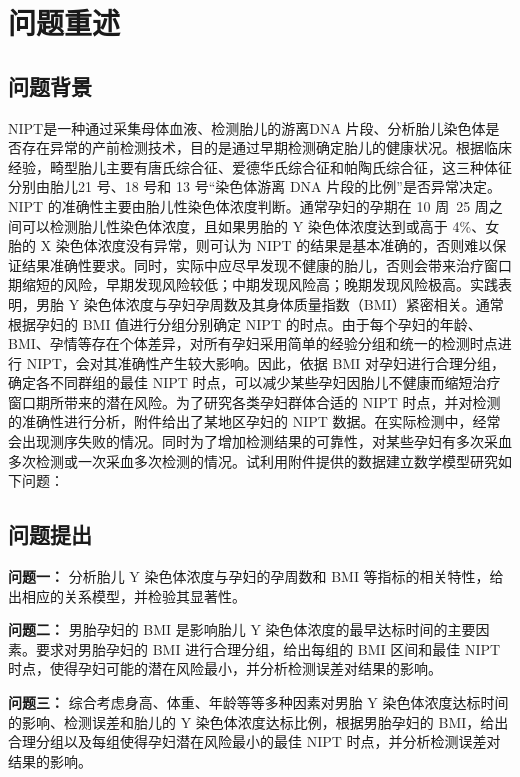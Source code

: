 \documentclass[withoutpreface,bwprint]{cumcmthesis} %
\begin{document}
\section{问题重述}
\subsection{问题背景}
NIPT是一种通过采集母体血液、检测胎儿的游离DNA 片段、分析胎儿染色体是否存在异常的产前检测技术，目的是通过早期检测确定胎儿的健康状况。根据临床经验，畸型胎儿主要有唐氏综合征、爱德华氏综合征和帕陶氏综合征，这三种体征分别由胎儿21 号、18 号和 13 号“染色体游离 DNA 片段的比例”是否异常决定。NIPT 的准确性主要由胎儿性染色体浓度判断。通常孕妇的孕期在 10 周~25 周之间可以检测胎儿性染色体浓度，且如果男胎的 Y 染色体浓度达到或高于 4\%、女胎的 X 染色体浓度没有异常，则可认为 NIPT 的结果是基本准确的，否则难以保证结果准确性要求。同时，实际中应尽早发现不健康的胎儿，否则会带来治疗窗口期缩短的风险，早期发现风险较低；中期发现风险高；晚期发现风险极高。实践表明，男胎 Y 染色体浓度与孕妇孕周数及其身体质量指数（BMI）紧密相关。通常根据孕妇的
BMI 值进行分组分别确定 NIPT 的时点。由于每个孕妇的年龄、BMI、孕情等存在个体差异，对所有孕妇采用简单的经验分组和统一的检测时点进行 NIPT，会对其准确性产生较大影响。因此，依据 BMI 对孕妇进行合理分组，确定各不同群组的最佳 NIPT 时点，可以减少某些孕妇因胎儿不健康而缩短治疗窗口期所带来的潜在风险。为了研究各类孕妇群体合适的 NIPT 时点，并对检测的准确性进行分析，附件给出了某地区孕妇的 NIPT 数据。在实际检测中，经常会出现测序失败的情况。同时为了增加检测结果的可靠性，对某些孕妇有多次采血多次检测或一次采血多次检测的情况。试利用附件提供的数据建立数学模型研究如下问题：

\subsection{问题提出}

\textbf{问题一：}
分析胎儿 Y 染色体浓度与孕妇的孕周数和 BMI 等指标的相关特性，给出相应的关系模型，并检验其显著性。

\textbf{问题二：}
男胎孕妇的 BMI 是影响胎儿 Y 染色体浓度的最早达标时间的主要因素。要求对男胎孕妇的 BMI 进行合理分组，给出每组的 BMI 区间和最佳 NIPT时点，使得孕妇可能的潜在风险最小，并分析检测误差对结果的影响。

\textbf{问题三：}
综合考虑身高、体重、年龄等等多种因素对男胎 Y 染色体浓度达标时间的影响、检测误差和胎儿的 Y 染色体浓度达标比例，根据男胎孕妇的 BMI，给出合理分组以及每组使得孕妇潜在风险最小的最佳 NIPT 时点，并分析检测误差对结果的影响。
\end{document}

